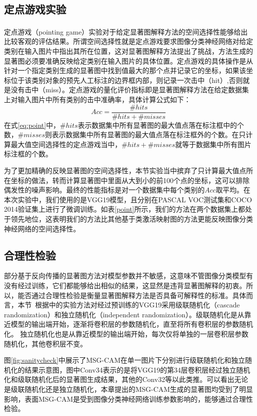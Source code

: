 \subsection{定点游戏实验}
定点游戏（pointing game）\textsuperscript{\cite{zhang2018top}}实验对于给定显著图解释方法的空间选择性能够给出比较客观的评估结果。所谓空间选择性就是定点游戏要求图像分类神经网络对给定类别在输入图片中指出其所在位置，这对显著图解释方法提出了挑战，方法生成的显著图必须要准确反映给定类别在输入图片的具体位置。定点游戏的具体操作是从针对一个指定类别生成的显著图中找到值最大的那个点并记录它的坐标，如果该坐标位于该类别对象的预先人工标注的边界框内部，则记录一次击中（hit）,否则就是没有击中（miss）。定点游戏的量化评价指标即是显著图解释方法在给定数据集上对输入图片中所有类别的击中准确率，具体计算公式如下：
\begin{equation}
	Acc=\frac{\#hits}{\#hits+\#misses}
\label{eq:point}
\end{equation}
在式\ref{eq:point}中，$\#hits$表示数据集中所有显著图的最大值点落在标注框中的个数，$\#misses$则表示数据集中所有显著图的最大值点落在标注框外的个数。在只计算最大值空间选择性的定点游戏当中，$\#hits+\#misses$就等于数据集中所有图片标注框的个数。

为了更加精确的反映显著图的空间选择性，本节实验当中摈弃了只计算最大值点所在坐标的做法，转而计算显著图中里面从大到小的前100个点的坐标，这可以排除偶发性的噪声影响。最终的性能指标是对一个数据集中每个类别的$Acc$取平均。在本次实验中，我们使用的是VGG19模型，且分别在PASCAL VOC测试集和COCO 2014验证集上进行了微调训练。如表\ref{point}所示，我们的方法在两个数据集上都处于领先地位，这表明我们的方法比其他基于类激活映射图的方法更能反映图像分类神经网络的空间选择性。

\subsection{合理性检验}
部分基于反向传播的显著图方法对模型参数并不敏感，这意味不管图像分类模型有没有经过训练，它们都能够给出相似的结果，这显然是违背显著图解释的初衷。所以，能否通过合理性检验是衡量显著图解释方法是否具备可解释性的标准。具体而言，本节~\cite{zhang2018top}根据中的实验方法对经过预训练的VGG19采用级联随机化（cascade randomization）和独立随机化（independent randomization）。级联随机化是从靠近模型的输出端开始，逐渐将卷积层的参数随机化，直至将所有卷积层的参数随机化。 独立随机化也是从靠近模型的输出端开始，每次仅将单独的一层卷积层参数随机化，其他卷积层不变。

图\ref{fig:sanitycheck}中展示了MSG-CAM在单一图片下分别进行级联随机化和独立随机化的结果示意图，图中Conv34表示的是将VGG19的第34层卷积层经过独立随机化和级联随机化后的显著图生成结果，其他的Conv32等以此类推。可以看出无论是级联随机化还是独立随机化，本章提出的MSG-CAM生成的显著图均受到了明显影响，表面MSG-CAM是受到图像分类神经网络训练参数影响的，能够通过合理性检验。

